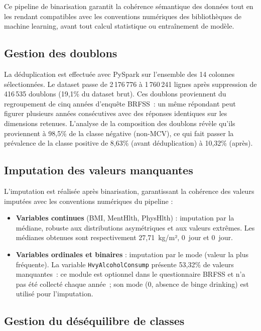 Ce pipeline de binarisation garantit la cohérence sémantique des données tout en les rendant compatibles avec les conventions numériques des bibliothèques de machine learning, avant tout calcul statistique ou entraînement de modèle.

\subsection{Gestion des doublons}

La déduplication est effectuée avec PySpark sur l'ensemble des 14 colonnes sélectionnées. Le dataset passe de 2\,176\,776 à 1\,760\,241 lignes après suppression de 416\,535 doublons (19,1\% du dataset brut). Ces doublons proviennent du regroupement de cinq années d'enquête BRFSS~: un même répondant peut figurer plusieurs années consécutives avec des réponses identiques sur les dimensions retenues. L'analyse de la composition des doublons révèle qu'ils proviennent à 98,5\% de la classe négative (non-MCV), ce qui fait passer la prévalence de la classe positive de 8,63\% (avant déduplication) à 10,32\% (après).

\subsection{Imputation des valeurs manquantes}

L'imputation est réalisée après binarisation, garantissant la cohérence des valeurs imputées avec les conventions numériques du pipeline :

\begin{itemize}
    \item \textbf{Variables continues} (BMI, MentHlth, PhysHlth) : imputation par la médiane, robuste aux distributions asymétriques et aux valeurs extrêmes. Les médianes obtenues sont respectivement 27,71~kg/m², 0~jour et 0~jour.
    \item \textbf{Variables ordinales et binaires} : imputation par le mode (valeur la plus fréquente). La variable \texttt{HvyAlcoholConsump} présente 53,32\% de valeurs manquantes~: ce module est optionnel dans le questionnaire BRFSS et n'a pas été collecté chaque année~; son mode (0, absence de binge drinking) est utilisé pour l'imputation.
\end{itemize}

\subsection{Gestion du déséquilibre de classes}


